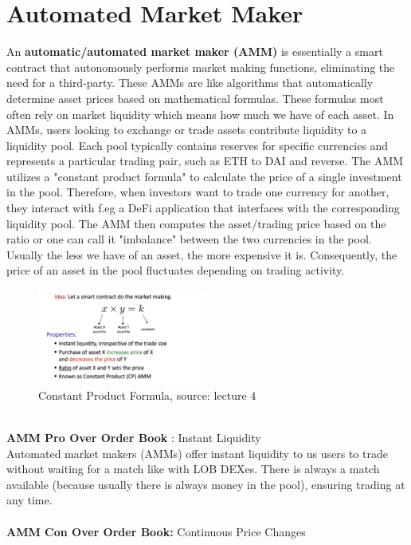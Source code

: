 \documentclass{article}
\begin{document}
\section{Automated Market Maker}
An \textbf{automatic/automated market maker (AMM)} is essentially a smart contract that autonomously performs market making functions, eliminating the need for a third-party. These AMMs are like algorithms that automatically determine asset prices based on mathematical formulas. These formulas most often rely on market liquidity which means how much we have of each asset. In AMMs, users looking to exchange or trade assets contribute liquidity to a liquidity pool. Each pool typically contains reserves for specific currencies and represents a particular trading pair, such as ETH to DAI and reverse. The AMM utilizes a "constant product formula" to calculate the price of a single investment in the pool. Therefore, when investors want to trade one currency for another, they interact with f.eg a DeFi application that interfaces with the corresponding liquidity pool. The AMM then computes the asset/trading price based on the ratio or one can call it "imbalance" between the two currencies in the pool. Usually the less we have of an asset, the more expensive it is. Consequently, the price of an asset in the pool fluctuates depending on trading activity.
\\
\begin{figure}[h]
    \centering
    \includegraphics[width=0.5\textwidth]{Bildschirmfoto 2024-04-02 um 15.09.34.png} 
    \caption{Constant Product Formula, \scriptsize{source: lecture 4}}
    \label{fig:DoS-attack}
\end{figure}
\\\textbf{AMM Pro Over Order Book }: Instant Liquidity\\
Automated market makers (AMMs) offer instant liquidity to us users to trade without waiting for a match like with LOB DEXes. There is always a match available (because usually there is always money in the pool), ensuring trading at any time.\\\\
\textbf{AMM Con Over Order Book:} Continuous Price Changes\\
\end{document}
